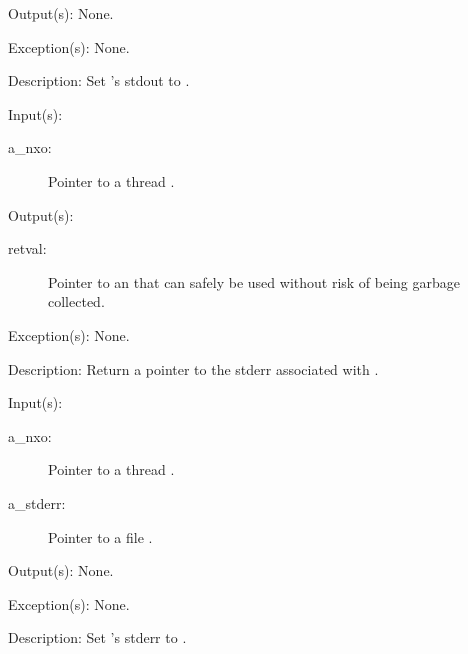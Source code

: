 \begin{capi}
\begin{capilist}
	\item[Output(s): ] None.
	\item[Exception(s): ] None.
	\item[Description: ]
		Set 's stdout to .
	\end{capilist}
\label{nxo_thread_stderr_get}
	\begin{capilist}
	\item[Input(s): ]
		\begin{description}\item[]
		\item[a\_nxo: ]
			Pointer to a thread .
		\end{description}
	\item[Output(s): ]
		\begin{description}\item[]
		\item[retval: ]
			Pointer to an  that can safely be used
			without risk of being garbage collected.
		\end{description}
	\item[Exception(s): ] None.
	\item[Description: ]
		Return a pointer to the stderr associated with .
	\end{capilist}
\label{nxo_thread_stderr_set}
	\begin{capilist}
	\item[Input(s): ]
		\begin{description}\item[]
		\item[a\_nxo: ]
			Pointer to a thread \classname{nxo}.
		\item[a\_stderr: ]
			Pointer to a file \classname{nxo}.
		\end{description}
	\item[Output(s): ] None.
	\item[Exception(s): ] None.
	\item[Description: ]
		Set 's stderr to \cvar{a\_stderr}.
	\end{capilist}
\end{capi}
